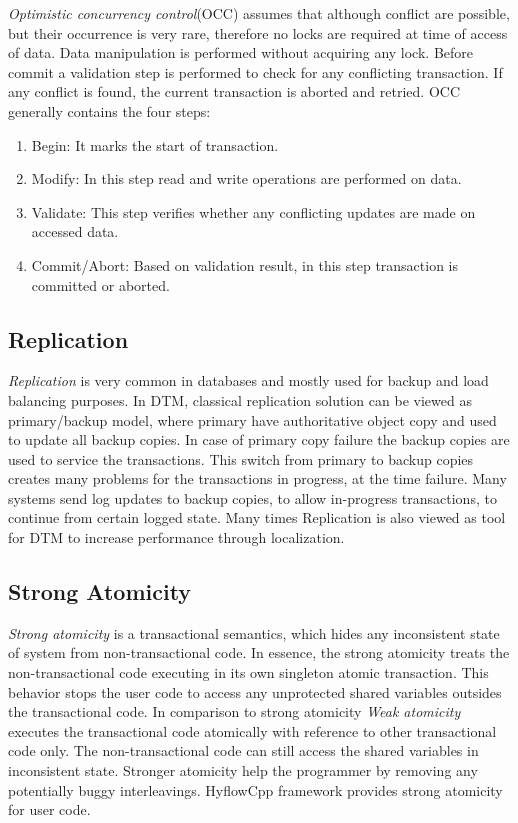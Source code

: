\documentclass[12pt,english]{report}
\begin{document}
\textit{Optimistic concurrency control}(OCC) assumes that although conflict are possible, but their occurrence is very rare, therefore no locks are required at time of access of data. Data manipulation is performed without acquiring any lock. Before commit a validation step is performed to check for any conflicting transaction. If any conflict is found, the current transaction is aborted and retried. OCC generally contains the four steps:

\begin{enumerate}
\item Begin: It marks the start of transaction.
\item Modify: In this step read and write operations are performed on data.
\item Validate: This step verifies whether any conflicting updates are made on accessed data.
\item Commit/Abort: Based on validation result, in this step transaction is committed or aborted.
\end{enumerate}   

\subsection{Replication}

\textit{Replication} is very common in databases and mostly used for backup and load balancing purposes. In DTM, classical replication solution can be viewed as primary/backup model, where primary have authoritative object copy and used to update all backup copies. In case of primary copy failure the backup copies are used to service the transactions. This switch from primary to backup copies creates many problems for the transactions in progress, at the time failure. Many systems send log updates to backup copies, to allow in-progress transactions, to continue from certain logged state. Many times Replication is also viewed as tool for DTM to increase performance through localization.

\subsection{Strong Atomicity}

\textit{Strong atomicity} is a transactional semantics, which hides any inconsistent state of system from non-transactional code. In essence, the strong atomicity treats the non-transactional code executing in its own singleton atomic transaction. This behavior stops the user code to access any unprotected shared variables outsides the transactional code. In comparison to strong atomicity \textit{ Weak atomicity} executes the transactional code atomically with reference to other transactional code only. The non-transactional code can still access the shared variables in inconsistent state. Stronger atomicity help the programmer by removing any potentially buggy interleavings. HyflowCpp framework provides strong atomicity for user code.     
\end{document}
